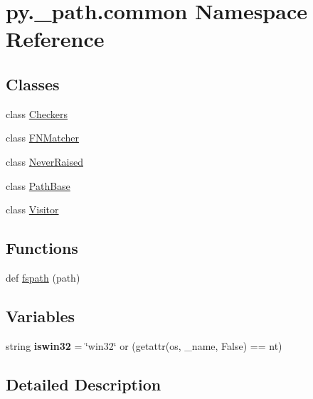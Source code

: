 \hypertarget{namespacepy_1_1__path_1_1common}{}\section{py.\+\_\+path.\+common Namespace Reference}
\label{namespacepy_1_1__path_1_1common}
\subsection*{Classes}
\begin{DoxyCompactItemize}
\item 
class \hyperlink{classpy_1_1__path_1_1common_1_1_checkers}{Checkers}
\item 
class \hyperlink{classpy_1_1__path_1_1common_1_1_f_n_matcher}{F\+N\+Matcher}
\item 
class \hyperlink{classpy_1_1__path_1_1common_1_1_never_raised}{Never\+Raised}
\item 
class \hyperlink{classpy_1_1__path_1_1common_1_1_path_base}{Path\+Base}
\item 
class \hyperlink{classpy_1_1__path_1_1common_1_1_visitor}{Visitor}
\end{DoxyCompactItemize}
\subsection*{Functions}
\begin{DoxyCompactItemize}
\item 
def \hyperlink{namespacepy_1_1__path_1_1common_abf82f227c254ea6c218bf3be0fec8a02}{fspath} (path)
\end{DoxyCompactItemize}
\subsection*{Variables}
\begin{DoxyCompactItemize}
\item 
\mbox{\label{namespacepy_1_1__path_1_1common_af3266767ecd70ce41d4ef27ef9da4e55}} 
string {\bfseries iswin32} = \char`\"{}win32\char`\"{} or (getattr(os, \textquotesingle{}\+\_\+name\textquotesingle{}, False) == \textquotesingle{}nt\textquotesingle{})
\end{DoxyCompactItemize}


\subsection{Detailed Description}
\begin{DoxyVerb}\end{DoxyVerb}
 

